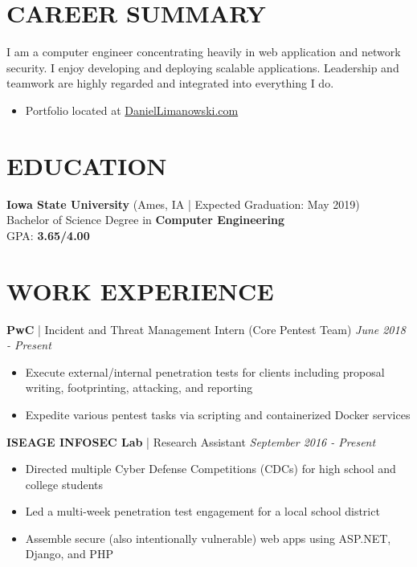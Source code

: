 \documentclass[line]{res}
\begin{document}
\address{(630) 450-0012\\dlimanow@iastate.edu\\Ames, Iowa}

\begin{resume}
\section{CAREER SUMMARY}
I am a computer engineer concentrating heavily in web application and network security. I enjoy developing and deploying scalable applications. Leadership and teamwork are highly regarded and integrated into everything I do.
\begin{itemize}
	\item Portfolio located at \href{https://DanielLimanowski.com/}{DanielLimanowski.com}
\end{itemize}

\section{EDUCATION}
\textbf{Iowa State University} (Ames, IA | Expected Graduation: May 2019)\\
Bachelor of Science Degree in \textbf{Computer Engineering}\\
GPA: \textbf{3.65/4.00}

\section{WORK EXPERIENCE}
\textbf{PwC} | Incident and Threat Management Intern (Core Pentest Team) \hfill \textit{June 2018 - Present}
\begin{itemize}
	\item Execute external/internal penetration tests for clients including proposal writing, footprinting, attacking, and reporting
	\item Expedite various pentest tasks via scripting and containerized Docker services
\end{itemize}
\textbf{ISEAGE INFOSEC Lab} | Research Assistant \hfill \textit{September 2016 - Present}
\begin{itemize}
	\item Directed multiple Cyber Defense Competitions (CDCs) for high school and college students
	\item Led a multi-week penetration test engagement for a local school district
	\item Assemble secure (also intentionally vulnerable) web apps using ASP.NET, Django, and PHP


\end{itemize}
\end{resume}
\end{document}
